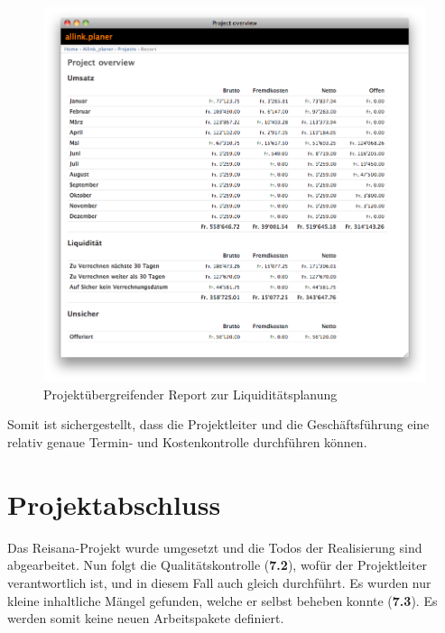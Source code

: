 \clearpage

\begin{figure}[htbp]
\begin{center}
\includegraphics[width=1.0\textwidth,angle=0]{./bilder/proof_of_concept/allink_planer_liq.png}
\caption[Projektübergreifender Report zur Liquiditätsplanung]{Projektübergreifender 
    Report zur Liquiditätsplanung\footnotemark}
\label{pic:allink_planer_liq}
\end{center}
\end{figure}

Somit ist sichergestellt, dass die Projektleiter und die Geschäftsführung eine
relativ genaue Termin- und Kostenkontrolle durchführen können.

\clearpage

\section{Projektabschluss}
Das Reisana-Projekt wurde umgesetzt und die Todos der Realisierung sind abgearbeitet.
Nun folgt die Qualitätskontrolle (\textbf{7.2}), wofür der Projektleiter
verantwortlich ist, und in diesem Fall auch gleich durchführt. Es wurden nur
kleine inhaltliche Mängel gefunden, welche er selbst beheben
konnte (\textbf{7.3}). Es werden somit keine neuen Arbeitspakete definiert.

